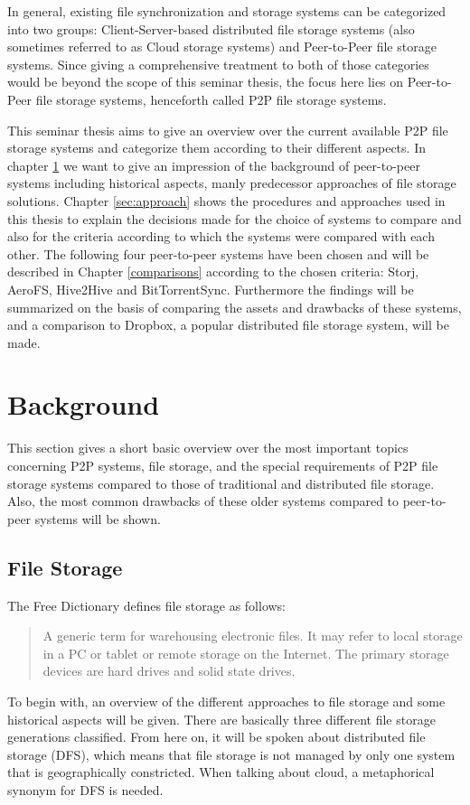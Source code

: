 In general, existing file synchronization and storage systems can be categorized into two groups: Client-Server-based distributed file storage systems (also sometimes referred to as Cloud storage systems) and Peer-to-Peer file storage systems. Since giving a comprehensive treatment to both of those categories would be beyond the scope of this seminar thesis, the focus here lies on Peer-to-Peer file storage systems, henceforth called P2P file storage systems.

This seminar thesis aims to give an overview over the current available P2P file storage systems and categorize them according to their different aspects. In chapter \ref{sec:background} we want to give an impression of the background of peer-to-peer systems including historical aspects, manly predecessor approaches of file storage solutions. Chapter \ref{sec:approach} shows the procedures and approaches used in this thesis to explain the decisions made for the choice of systems to compare and also for the criteria according to which the systems were compared with each other. The following four peer-to-peer systems have been chosen and will be described in Chapter \ref{comparisons} according to the chosen criteria: Storj, AeroFS, Hive2Hive and BitTorrentSync. Furthermore the findings will be summarized on the basis of comparing the assets and drawbacks of these systems, and a comparison to Dropbox, a popular distributed file storage system, will be made.

\section{Background}
\label{sec:background}
This section gives a short basic overview over the most important topics concerning P2P systems, file storage, and the special requirements of P2P file storage systems compared to those of traditional and distributed file storage. Also, the most common drawbacks of these older systems compared to peer-to-peer systems will be shown.

\subsection{File Storage}
The Free Dictionary defines file storage as follows:
\begin{quote}
A generic term for warehousing electronic files. It may refer to local storage in a PC or tablet or remote storage on the Internet. The primary storage devices are hard drives and solid state drives. \cite{thefreedictionary}
\end{quote}
To begin with, an overview of the different approaches to file storage and some historical aspects will be given. There are basically three different file storage generations classified. From here on, it will be spoken about distributed file storage (DFS), which means that file storage is not managed by only one system that is geographically constricted. When talking about cloud, a metaphorical synonym for DFS is needed.

